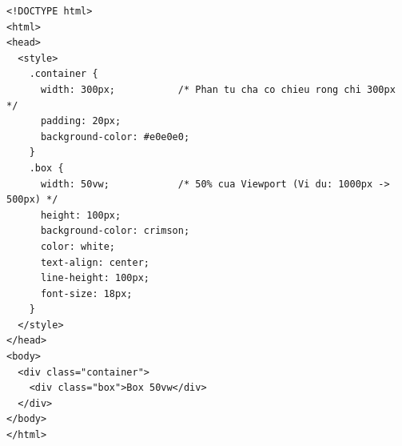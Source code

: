 \documentclass[11pt,oneside]{book}
\begin{document}
\begin{codeWindow}
\begin{lstlisting}[language=HTML5]
<!DOCTYPE html>
<html>
<head>
  <style>
    .container {
      width: 300px;           /* Phan tu cha co chieu rong chi 300px */
      padding: 20px;
      background-color: #e0e0e0;
    }
    .box {
      width: 50vw;            /* 50% cua Viewport (Vi du: 1000px -> 500px) */
      height: 100px;
      background-color: crimson;
      color: white;
      text-align: center;
      line-height: 100px;
      font-size: 18px;
    }
  </style>
</head>
<body>
  <div class="container">
    <div class="box">Box 50vw</div>
  </div>
</body>
</html>
\end{lstlisting}
\end{codeWindow}
\end{document}
